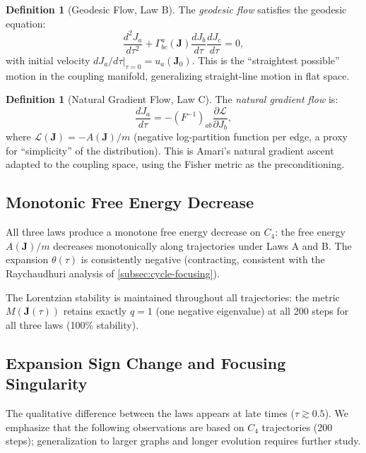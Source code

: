 \documentclass[11pt]{article}
\theoremstyle{definition}
\newtheorem{definition}[theorem]{Definition}
\theoremstyle{remark}
\newcommand{\Fish}{F}
\newcommand{\Met}{M}
\newcommand{\obs}{u}
\newcommand{\coupl}{\mathbf{J}}
\newcommand{\Chr}[2]{\Gamma^{#1}_{#2}}
\newcommand{\expan}{\theta}
\begin{document}
\begin{definition}[Geodesic Flow, Law B]
\label{def:law-b}
The \emph{geodesic flow} satisfies the geodesic equation:
\begin{equation}
  \frac{d^2 J_a}{d\tau^2} + \Chr{a}{bc}(\coupl)
    \frac{dJ_b}{d\tau}\frac{dJ_c}{d\tau} = 0,
  \label{eq:law-b}
\end{equation}
with initial velocity $dJ_a/d\tau\big|_{\tau=0} = \obs_a(\coupl_0)$.
This is the ``straightest possible'' motion in the coupling manifold,
generalizing straight-line motion in flat space.
\end{definition}

\begin{definition}[Natural Gradient Flow, Law C]
\label{def:law-c}
The \emph{natural gradient flow} is:
\begin{equation}
  \frac{dJ_a}{d\tau} = -(\Fish^{-1})_{ab} \frac{\partial \mathcal{L}}{\partial J_b},
  \label{eq:law-c}
\end{equation}
where $\mathcal{L}(\coupl) = -A(\coupl)/m$ (negative log-partition
function per edge, a proxy for ``simplicity'' of the distribution).
This is Amari's natural gradient ascent~\cite{Amari1998} adapted
to the coupling space, using the Fisher metric as the preconditioning.
\end{definition}

\subsection{Monotonic Free Energy Decrease}
\label{subsec:arrow-of-time}

All three laws produce a monotone free energy decrease on $C_4$:
the free energy $A(\coupl)/m$ decreases monotonically along trajectories
under Laws A and B. The expansion $\expan(\tau)$ is consistently negative
(contracting, consistent with the Raychaudhuri analysis of
\cref{subsec:cycle-focusing}).

The Lorentzian stability is maintained throughout all trajectories:
the metric $\Met(\coupl(\tau))$ retains exactly $q = 1$ (one negative
eigenvalue) at all 200 steps for all three laws (100\% stability).

\subsection{Expansion Sign Change and Focusing Singularity}
\label{subsec:bounce}

The qualitative difference between the laws appears at late times
($\tau \gtrsim 0.5$).  We emphasize that the following observations
are based on $C_4$ trajectories (200 steps); generalization to larger
graphs and longer evolution requires further study.
\end{document}
